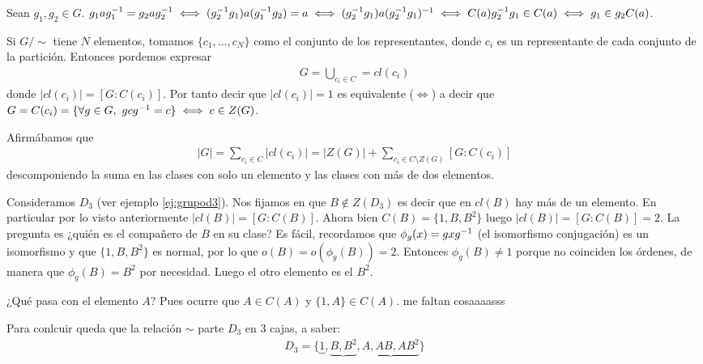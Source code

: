 Sean $g_1, g_2 \in G$. $g_1ag_1^{-1} = g_2ag_2^{-1} \iff (g_2^{-1}g_1)a(g_1^{-1}g_2) = a \iff (g_2^{-1}g_1)a(g_2^{-1}g_1)^{-1} \iff C(a) g_2^{-1}g_1 \in C(a) \iff g_1 \in g_2C(a)$.

Si $G/\sim$ tiene $N$ elementos, tomamos $\{c_1, \dots, c_N\}$ como el conjunto de los representantes, donde $c_i$ es un representante de cada conjunto de la partición. Entonces pordemos expresar
\begin{align*}
G = \bigcup_{c_i \in C} = cl(c_i)
\end{align*}
donde $|cl(c_i)| = [G:C(c_i)]$. Por tanto decir que $|cl(c_i)| = 1$ es equivalente ($\iff$) a decir que $G = C(c_i) = \{\forall g \in G,\ gc\inv{g} = c\} \iff c \in Z(G)$.

Afirmábamos que
\begin{align*}
|G| = \sum_{c_i \in C} |cl(c_i)| = |Z(G)| + \sum_{c_i \in C\setminus Z(G)} [G:C(c_i)]
\end{align*}
descomponiendo la suma en las clases con solo un elemento y las clases con más de dos elementos.

\hr

\begin{ej}
	Consideramos $D_3$ (ver ejemplo \ref{ej:grupod3}). Nos fijamos en que $B \not\in Z(D_3)$ es decir que en $cl(B)$ hay más de un elemento. En particular por lo visto anteriormente $|cl(B)| = [G:C(B)]$. Ahora bien $C(B) = \{1, B, B^2\}$ luego $|cl(B)| = [G:C(B)] = 2$. La pregunta es ¿quién es el compañero de $B$ en su clase? Es fácil, recordamos que $\phi_g (x) = gxg^{-1}$ (el isomorfismo conjugación) es un isomorfismo y que $\{1, B, B^2\}$ es normal, por lo que $o(B) = o(\phi_g(B)) = 2$. Entonces $\phi_g(B) \neq 1$ porque no coinciden los órdenes, de manera que $\phi_g(B) = B^2$ por necesidad. Luego el otro elemento es el $B^2$.
	
	¿Qué pasa con el elemento $A$? Pues ocurre que $A \in C(A)$ y $\{1, A\} \in C(A)$. me faltan cosaaaasss
	
	Para conlcuir queda que la relación $\sim$ parte $D_3$ en 3 cajas, a saber:
	\begin{align*}
	D_3 = \{\underbrace{1}, \underbrace{B, B^2}, \underbrace{A, AB, AB^2}\}
	\end{align*}
\end{ej}


